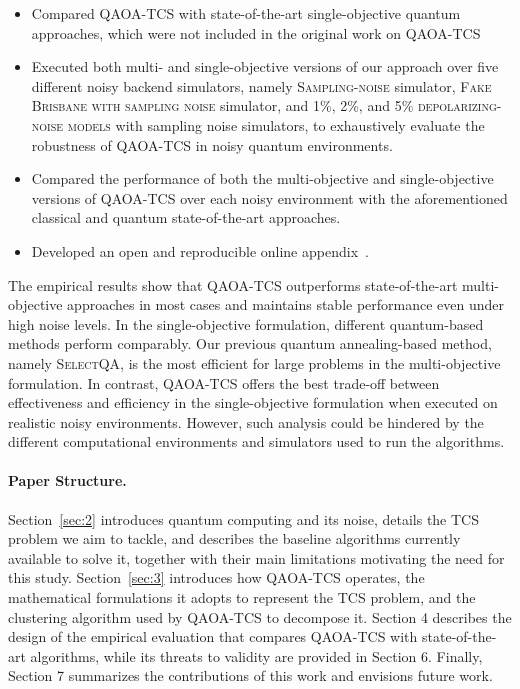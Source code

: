\begin{itemize}
    \item Compared \textsc{QAOA-TCS} with state-of-the-art single-objective quantum approaches, which were not included in the original work on \textsc{QAOA-TCS}
    \item Executed both multi- and single-objective versions of our approach over five different noisy backend simulators, namely \textsc{Sampling-noise} simulator, \textsc{Fake Brisbane with sampling noise} simulator, and 1\%, 2\%, and 5\% \textsc{depolarizing-noise models} with sampling noise simulators, to exhaustively evaluate the robustness of \textsc{QAOA-TCS} in noisy quantum environments.
    \item Compared the performance of both the multi-objective and single-objective versions of \textsc{QAOA-TCS} over each noisy environment with the aforementioned classical and quantum state-of-the-art approaches.
    \item Developed an open and reproducible online appendix~\citep{appendix}.
\end{itemize}

The empirical results show that \textsc{QAOA-TCS} outperforms state-of-the-art multi-objective approaches in most cases and maintains stable performance even under high noise levels. In the single-objective formulation, different quantum-based methods perform comparably. Our previous quantum annealing-based method, namely \textsc{SelectQA}, is the most efficient for large problems in the multi-objective formulation. In contrast, \textsc{QAOA-TCS} offers the best trade-off between effectiveness and efficiency in the single-objective formulation when executed on realistic noisy environments. However, such analysis could be hindered by the different computational environments and simulators used to run the algorithms.

\paragraph{Paper Structure.} Section~\ref{sec:2} introduces quantum computing and its noise, details the TCS problem we aim to tackle, and describes the baseline algorithms currently available to solve it, together with their main limitations motivating the need for this study. Section~\ref{sec:3} introduces how \textsc{QAOA-TCS} operates, the mathematical formulations it adopts to represent the TCS problem, and the clustering algorithm used by \textsc{QAOA-TCS} to decompose it. Section 4 describes the design of the empirical evaluation that compares \textsc{QAOA-TCS} with state-of-the-art algorithms, while its threats to validity are provided in Section 6. Finally, Section 7 summarizes the contributions of this work and envisions future work.

